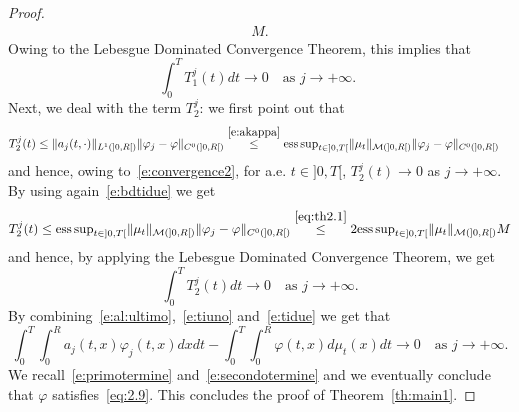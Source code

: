 \documentclass[11pt,leqno]{amsart}
\numberwithin{equation}{section}
\begin{document}
\begin{proof}
\begin{equation*}
\begin{split}
    M.
\end{split}
\end{equation*}
Owing to the Lebesgue Dominated 
Convergence Theorem, this implies that 
\begin{equation}
\label{e:tiuno}
 \int_0^T T^j_1 (t) dt \to 0 \quad \text{as $j \to + \infty$. }
\end{equation} 
Next, we deal with the term $T^j_2$: we first point out that 
\begin{equation}
\label{e:bdtidue}
\begin{split}
   T^j_2 (t) \leq 
   \| a_j (t, \cdot) \|_{L^1 (]0, R[)} \| {\varphi}_j - {\varphi} \|_{C^0 (]0, R[)}
   & \stackrel{\eqref{e:akappa}}{\leq} 
     \mathrm{ess \, sup}_{t \in ]0, T[} 
      \| \mu_t \|_{\mathcal M(]0, R[)}
     \| {\varphi}_j - {\varphi} \|_{C^0 (]0, R[)} 
     \end{split}
\end{equation}
 and hence, owing to~\eqref{e:convergence2}, for a.e. $t \in ]0, T[$,
 $T^j_2(t) \to 0$ as $j \to + \infty$.  By using again~\eqref{e:bdtidue} we get 
 $$
     T^j_2 (t) \leq 
     \mathrm{ess \, sup}_{t \in ]0, T[} 
      \| \mu_t \|_{\mathcal M(]0, R[)}
     \| {\varphi}_j - {\varphi} \|_{C^0 (]0, R[)} \stackrel{\eqref{eq:th2.1}}{\leq}
     2   \mathrm{ess \, sup}_{t \in ]0, T[} 
      \| \mu_t \|_{\mathcal M(]0, R[)} M
 $$
and hence, by applying the Lebesgue Dominated 
Convergence Theorem, 
we get 
\begin{equation}
\label{e:tidue}
   \int_0^T  T^j_2 (t) dt \to 0 
   \quad \text{as $j \to + \infty$}.
\end{equation}
By combining~\eqref{e:al:ultimo},~\eqref{e:tiuno} and~\eqref{e:tidue} we get that 
$$
    \int_0^T     \int_0^R 
    a_j (t, x) {\varphi}_j  (t, x)dx dt 
    - \int_0^T \int_0^R  {\varphi}(t, x) d \mu_t (x)
    dt \to 0 \quad \text{as $j \to + \infty$}.
$$
We recall~\eqref{e:primotermine} and~\eqref{e:secondotermine} and we eventually conclude that ${\varphi}$ satisfies~\eqref{eq:2.9}. This concludes the proof of Theorem~\ref{th:main1}.  
\end{proof}
\end{document}
